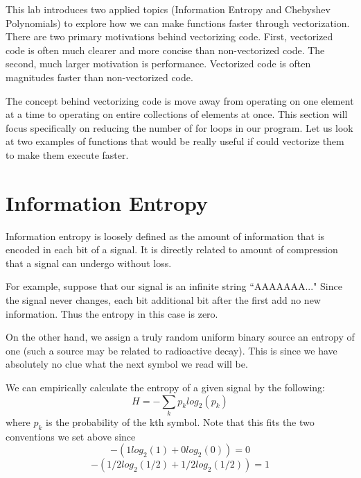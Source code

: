 

This lab introduces two applied topics (Information Entropy and Chebyshev Polynomials) to explore how we can make functions faster through vectorization.  There are two primary motivations behind vectorizing code.  First, vectorized code is often much clearer and more concise than non-vectorized code.  The second, much larger motivation is performance.  Vectorized code is often magnitudes faster than non-vectorized code.  

The concept behind vectorizing code is move away from operating on one element at a time to operating on entire collections of elements at once.  This section will focus specifically on reducing the number of for loops in our program.  Let us look at two examples of functions that would be really useful if could vectorize them to make them execute faster.

\section*{Information Entropy}

Information entropy is loosely defined as the amount of information that is encoded in each bit of a signal. It is directly related to amount of compression that a signal can undergo without loss.

For example, suppose that our signal is an infinite string ``AAAAAAA..." Since the signal never changes, each bit additional bit after the first add no new information. Thus the entropy in this case is zero.

On the other hand, we assign a truly random uniform binary source an entropy of one (such a source may be related to radioactive decay). This is since we have absolutely no clue what the next symbol we read will be.

We can empirically calculate the entropy of a given signal by the following:
\[
H = -\sum_k{p_k log_2(p_k)}
\]
where $p_k$ is the probability of the kth symbol. Note that this fits the two conventions we set above since
\[
-(1log_2(1) + 0 log_2(0)) = 0
\]
\[
-(1/2log_2(1/2) + 1/2log_2(1/2)) = 1
\]

